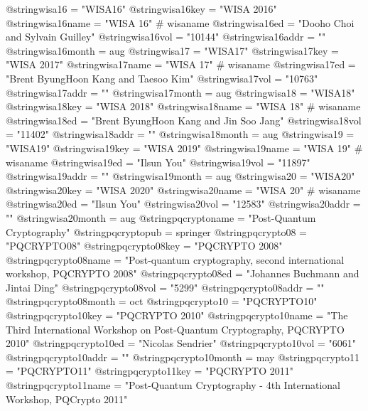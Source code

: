 @string{wisa16 =                "WISA16"}
@string{wisa16key =             "WISA 2016"}
@string{wisa16name =            "WISA 16" # wisaname}
@string{wisa16ed =              "Dooho Choi and Sylvain Guilley"}
@string{wisa16vol =             "10144"}
@string{wisa16addr =            ""}
@string{wisa16month =           aug}
@string{wisa17 =                "WISA17"}
@string{wisa17key =             "WISA 2017"}
@string{wisa17name =            "WISA 17" # wisaname}
@string{wisa17ed =              "Brent ByungHoon Kang and Taesoo Kim"}
@string{wisa17vol =             "10763"}
@string{wisa17addr =            ""}
@string{wisa17month =           aug}
@string{wisa18 =                "WISA18"}
@string{wisa18key =             "WISA 2018"}
@string{wisa18name =            "WISA 18" # wisaname}
@string{wisa18ed =              "Brent ByungHoon Kang and Jin Soo Jang"}
@string{wisa18vol =             "11402"}
@string{wisa18addr =            ""}
@string{wisa18month =           aug}
@string{wisa19 =                "WISA19"}
@string{wisa19key =             "WISA 2019"}
@string{wisa19name =            "WISA 19" # wisaname}
@string{wisa19ed =              "Ilsun You"}
@string{wisa19vol =             "11897"}
@string{wisa19addr =            ""}
@string{wisa19month =           aug}
@string{wisa20 =                "WISA20"}
@string{wisa20key =             "WISA 2020"}
@string{wisa20name =            "WISA 20" # wisaname}
@string{wisa20ed =              "Ilsun You"}
@string{wisa20vol =             "12583"}
@string{wisa20addr =            ""}
@string{wisa20month =           aug}
@string{pqcryptoname =          "Post-Quantum Cryptography"}
@string{pqcryptopub =           springer}
@string{pqcrypto08 =            "PQCRYPTO08"}
@string{pqcrypto08key =         "PQCRYPTO 2008"}
@string{pqcrypto08name =        "Post-quantum cryptography, second international workshop, PQCRYPTO 2008"}
@string{pqcrypto08ed =          "Johannes Buchmann and Jintai Ding"}
@string{pqcrypto08vol =         "5299"}
@string{pqcrypto08addr =        ""}
@string{pqcrypto08month =       oct}
@string{pqcrypto10 =            "PQCRYPTO10"}
@string{pqcrypto10key =         "PQCRYPTO 2010"}
@string{pqcrypto10name =        "The Third International Workshop on Post-Quantum Cryptography, PQCRYPTO 2010"}
@string{pqcrypto10ed =          "Nicolas Sendrier"}
@string{pqcrypto10vol =         "6061"}
@string{pqcrypto10addr =        ""}
@string{pqcrypto10month =       may}
@string{pqcrypto11 =            "PQCRYPTO11"}
@string{pqcrypto11key =         "PQCRYPTO 2011"}
@string{pqcrypto11name =        "Post-Quantum Cryptography - 4th International Workshop, PQCrypto 2011"}
